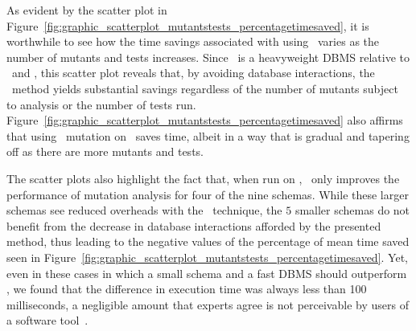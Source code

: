 

 As evident by the scatter plot in Figure~\ref{fig:graphic_scatterplot_mutantstests_percentagetimesaved}, it is worthwhile to see how the time savings associated with using \virtualmutationanalysis~varies as the number of mutants and tests increases. Since \postgres~is a heavyweight DBMS relative to \HyperSQL~and \sqlite, this scatter plot reveals that, by avoiding database interactions, the \virtual~method yields substantial savings regardless of the number of mutants subject to analysis or the number of tests run.  Figure~\ref{fig:graphic_scatterplot_mutantstests_percentagetimesaved} also affirms that using \virtual~mutation on \HyperSQL~saves time, albeit in a way that is gradual and tapering off as there are more mutants and tests.


The scatter plots also highlight the fact that, when run on \sqlite, \virtual~only improves the performance of mutation analysis for four of the nine schemas. While these larger schemas see reduced overheads with the \virtual~technique, the $5$ smaller schemas do not benefit from the decrease in database interactions afforded by the presented method, thus leading to the negative values of the percentage of mean time saved seen in Figure~\ref{fig:graphic_scatterplot_mutantstests_percentagetimesaved}. Yet, even in these cases in which a small schema and a fast DBMS should outperform \vma, we found that the difference in execution time was always less than 100 milliseconds, a negligible amount that experts agree is not perceivable by users of a software tool~\cite{Neumann2015}.



